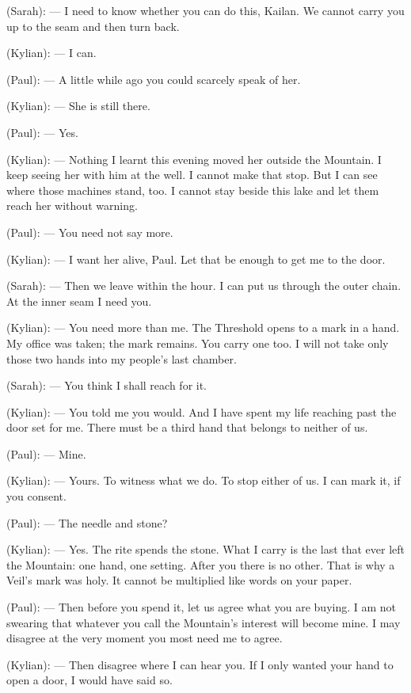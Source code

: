 \begin{room}
(Sarah): --- I need to know whether you can do this, Kailan. We cannot carry you up to the seam and then turn back.

(Kylian): --- I can.

(Paul): --- A little while ago you could scarcely speak of her.

\centerline{}

(Kylian): --- She is still there.

(Paul): --- Yes.

(Kylian): --- Nothing I learnt this evening moved her outside the Mountain. I keep seeing her with him at the well. I cannot make that stop. But I can see where those machines stand, too. I cannot stay beside this lake and let them reach her without warning.

(Paul): --- You need not say more.

(Kylian): --- I want her alive, Paul. Let that be enough to get me to the door.

(Sarah): --- Then we leave within the hour. I can put us through the outer chain. At the inner seam I need you.

(Kylian): --- You need more than me. The Threshold opens to a mark in a hand. My office was taken; the mark remains. You carry one too. I will not take only those two hands into my people's last chamber.

(Sarah): --- You think I shall reach for it.

(Kylian): --- You told me you would. And I have spent my life reaching past the door set for me. There must be a third hand that belongs to neither of us.

(Paul): --- Mine.

(Kylian): --- Yours. To witness what we do. To stop either of us. I can mark it, if you consent.

(Paul): --- The needle and stone?

(Kylian): --- Yes. The rite spends the stone. What I carry is the last that ever left the Mountain: one hand, one setting. After you there is no other. That is why a Veil's mark was holy. It cannot be multiplied like words on your paper.

(Paul): --- Then before you spend it, let us agree what you are buying. I am not swearing that whatever you call the Mountain's interest will become mine. I may disagree at the very moment you most need me to agree.

(Kylian): --- Then disagree where I can hear you. If I only wanted your hand to open a door, I would have said so.


\end{room}
